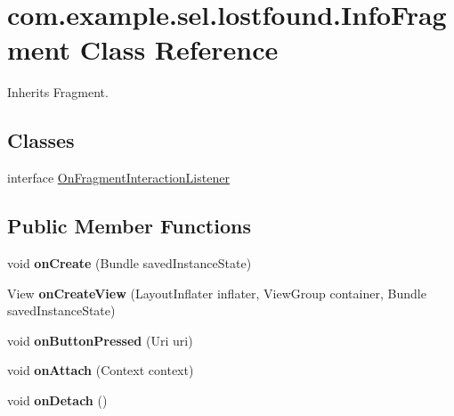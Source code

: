 \hypertarget{classcom_1_1example_1_1sel_1_1lostfound_1_1InfoFragment}{\section{com.\-example.\-sel.\-lostfound.\-Info\-Fragment \-Class \-Reference}
\label{classcom_1_1example_1_1sel_1_1lostfound_1_1InfoFragment}
}


\-Inherits \-Fragment.

\subsection*{\-Classes}
\begin{DoxyCompactItemize}
\item 
interface \hyperlink{interfacecom_1_1example_1_1sel_1_1lostfound_1_1InfoFragment_1_1OnFragmentInteractionListener}{\-On\-Fragment\-Interaction\-Listener}
\end{DoxyCompactItemize}
\subsection*{\-Public \-Member \-Functions}
\begin{DoxyCompactItemize}
\item 
\hypertarget{classcom_1_1example_1_1sel_1_1lostfound_1_1InfoFragment_a1a9382b4b0ceacfc464559a897fa7656}{void {\bfseries on\-Create} (\-Bundle saved\-Instance\-State)}\label{classcom_1_1example_1_1sel_1_1lostfound_1_1InfoFragment_a1a9382b4b0ceacfc464559a897fa7656}

\item 
\hypertarget{classcom_1_1example_1_1sel_1_1lostfound_1_1InfoFragment_adb5e6a68883e5b4cb236e0e2e221d7f4}{\-View {\bfseries on\-Create\-View} (\-Layout\-Inflater inflater, \-View\-Group container, \-Bundle saved\-Instance\-State)}\label{classcom_1_1example_1_1sel_1_1lostfound_1_1InfoFragment_adb5e6a68883e5b4cb236e0e2e221d7f4}

\item 
\hypertarget{classcom_1_1example_1_1sel_1_1lostfound_1_1InfoFragment_a20ae678d3072262f318a083241372871}{void {\bfseries on\-Button\-Pressed} (\-Uri uri)}\label{classcom_1_1example_1_1sel_1_1lostfound_1_1InfoFragment_a20ae678d3072262f318a083241372871}

\item 
\hypertarget{classcom_1_1example_1_1sel_1_1lostfound_1_1InfoFragment_a07cb9a9ac26dec9f20abce73c04f92e1}{void {\bfseries on\-Attach} (\-Context context)}\label{classcom_1_1example_1_1sel_1_1lostfound_1_1InfoFragment_a07cb9a9ac26dec9f20abce73c04f92e1}

\item 
\hypertarget{classcom_1_1example_1_1sel_1_1lostfound_1_1InfoFragment_a1fff5a01de59e68f81999e2c558325ba}{void {\bfseries on\-Detach} ()}\label{classcom_1_1example_1_1sel_1_1lostfound_1_1InfoFragment_a1fff5a01de59e68f81999e2c558325ba}

\end{DoxyCompactItemize}
